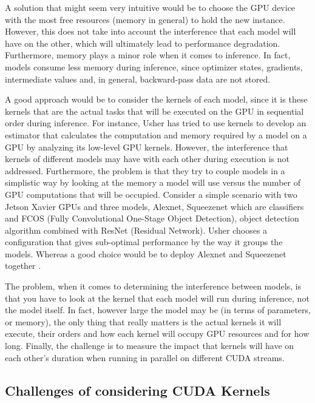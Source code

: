 A solution that might seem very intuitive would be to choose the GPU device with the most free resources (memory in general) to hold the new instance. However, this does not take into account the interference that each model will have on the other, which will ultimately lead to performance degradation. Furthermore, memory plays a minor role when it comes to inference. In fact, models consume less memory during inference, since optimizer states, gradients, intermediate values and, in general, backward-pass data are not stored.

A good approach would be to consider the kernels of each model, since it is these kernels that are the actual tasks that will be executed on the GPU in sequential order during inference. For instance, Usher has tried to use kernels to develop an estimator that calculates the computation and memory required by a model on a GPU by analyzing its low-level GPU kernels. However, the interference that kernels of different models may have with each other during execution is not addressed. Furthermore, the problem is that they try to couple models in a simplistic way by looking at the memory a model will use versus the number of GPU computations that will be occupied. Consider a simple scenario with two Jetson Xavier GPUs and three models, Alexnet, Squeezenet which are classifiers and FCOS (Fully Convolutional One-Stage Object Detection), object detection algorithm combined with ResNet (Residual Network). Usher chooses a configuration that gives sub-optimal performance by the way it groups the models. Whereas a good choice would be to deploy Alexnet and Squeezenet together .

The problem, when it comes to determining the interference between models, is that you have to look at the kernel that each model will run during inference, not the model itself. In fact, however large the model may be (in terms of parameters, or memory), the only thing that really matters is the actual kernels it will execute, their orders and how each kernel will occupy GPU resources and for how long. Finally, the challenge is to measure the impact that kernels will have on each other's duration when running in parallel on different CUDA streams.

\subsection{Challenges of considering CUDA Kernels}

